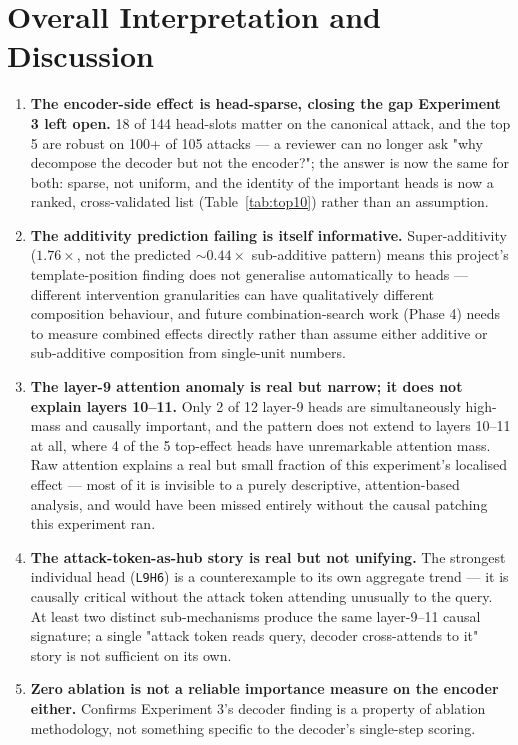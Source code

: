 \documentclass[11pt]{article}
\begin{document}
\section{Overall Interpretation and Discussion}

\begin{enumerate}
  \item \textbf{The encoder-side effect is head-sparse, closing the gap Experiment 3
  left open.} 18 of 144 head-slots matter on the canonical attack, and the top 5 are
  robust on 100+ of 105 attacks — a reviewer can no longer ask "why decompose the
  decoder but not the encoder?"; the answer is now the same for both: sparse, not
  uniform, and the identity of the important heads is now a ranked, cross-validated
  list (Table~\ref{tab:top10}) rather than an assumption.
  \item \textbf{The additivity prediction failing is itself informative.}
  Super-additivity ($1.76\times$, not the predicted $\sim 0.44\times$ sub-additive
  pattern) means this project's template-position finding does not generalise
  automatically to heads — different intervention granularities can have qualitatively
  different composition behaviour, and future combination-search work (Phase 4) needs to
  measure combined effects directly rather than assume either additive or sub-additive
  composition from single-unit numbers.
  \item \textbf{The layer-9 attention anomaly is real but narrow; it does not explain
  layers 10--11.} Only 2 of 12 layer-9 heads are simultaneously high-mass and causally
  important, and the pattern does not extend to layers 10--11 at all, where 4 of the 5
  top-effect heads have unremarkable attention mass. Raw attention explains a real but
  small fraction of this experiment's localised effect — most of it is invisible to a
  purely descriptive, attention-based analysis, and would have been missed entirely
  without the causal patching this experiment ran.
  \item \textbf{The attack-token-as-hub story is real but not unifying.} The strongest
  individual head (\texttt{L9H6}) is a counterexample to its own aggregate trend — it is
  causally critical without the attack token attending unusually to the query. At least
  two distinct sub-mechanisms produce the same layer-9--11 causal signature; a single
  "attack token reads query, decoder cross-attends to it" story is not sufficient on its
  own.
  \item \textbf{Zero ablation is not a reliable importance measure on the encoder
  either.} Confirms Experiment 3's decoder finding is a property of ablation methodology,
  not something specific to the decoder's single-step scoring.
\end{enumerate}
\end{document}
